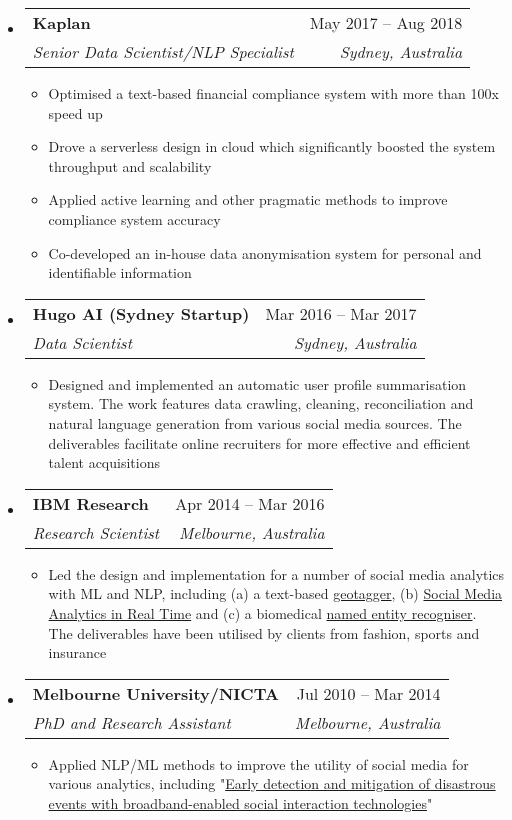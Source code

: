 \documentclass[letterpaper,12pt]{article}[leftmargin=*]
\makeatletter
\def \entryspacing {-0pt}
\newcommand{\resumeEntryStart}{\begin{itemize}[leftmargin=2.5mm]}
\newcommand{\resumeEntryEnd}{\end{itemize}\vspace{\entryspacing}}
\newcommand{\resumeItemListStart}{\begin{itemize}[leftmargin=4.5mm]}
\newcommand{\resumeItemListEnd}{\end{itemize}}
\newcommand{\resumeItem}[1]{
  \item\small{
    {#1 \vspace{-2pt}}
  }
}
\newcommand{\resumeEntryTSDL}[4]{
  \vspace{-1pt}\item[]
    \begin{tabularx}{0.97\textwidth}{X@{\hspace{60pt}}r}
      \textbf{\color{primary}#1} & {\firabook\color{accent}\small#2} \\
      \textit{\color{accent}\small#3} & \textit{\color{accent}\small#4} \\
    \end{tabularx}\vspace{-6pt}
}
\makeatother
\begin{document}
  \resumeEntryStart
    \resumeEntryTSDL
      {Kaplan}{May 2017 -- Aug 2018}
      {Senior Data Scientist/NLP Specialist}{Sydney, Australia}
    \resumeItemListStart
      \resumeItem {Optimised a text-based financial compliance system with more than 100x speed up} 
      \resumeItem{Drove a serverless design in cloud which significantly boosted the system throughput and scalability}
      \resumeItem {Applied active learning and other pragmatic methods to improve compliance system accuracy}
      \resumeItem {Co-developed an in-house data anonymisation system for personal and identifiable information}
    \resumeItemListEnd
  \resumeEntryEnd

  \resumeEntryStart
    \resumeEntryTSDL
      {Hugo AI (Sydney Startup)}{Mar 2016 -- Mar 2017}
      {Data Scientist}{Sydney, Australia}
    \resumeItemListStart
        \resumeItem {Designed and implemented an automatic user profile summarisation system. The work features data crawling, cleaning, reconciliation and natural language generation from various social media sources. The deliverables facilitate online recruiters for more effective and efficient talent acquisitions}
    \resumeItemListEnd
  \resumeEntryEnd

  \resumeEntryStart
    \resumeEntryTSDL
      {IBM Research}{Apr 2014 -- Mar 2016}
      {Research Scientist}{Melbourne, Australia}
    \resumeItemListStart
      \resumeItem {Led the design and implementation for a number of social media analytics with ML and NLP, including (a) a text-based \href{http://researcher.watson.ibm.com/researcher/view_group.php?id=6349}{geotagger}, (b) \href{http://researcher.watson.ibm.com/researcher/view_group.php?id=6350}{Social Media Analytics in Real Time} and (c) a biomedical \href{http://researcher.watson.ibm.com/researcher/view_group_pubs.php?grp=5727}{named entity recogniser}. The deliverables have been utilised by clients from fashion, sports and insurance}
    \resumeItemListEnd
  \resumeEntryEnd

  \resumeEntryStart
    \resumeEntryTSDL
      {Melbourne University/NICTA}{Jul 2010 -- Mar 2014}
      {PhD and Research Assistant}{Melbourne, Australia}
    \resumeItemListStart
      \resumeItem {Applied NLP/ML methods to improve the utility of social media for various analytics, including "\href{http://research.unimelb.edu.au/__data/assets/pdf_file/0006/1891914/IBES-2012-Annual-Report.pdf}{Early detection and mitigation of disastrous events with broadband-enabled social interaction technologies}"}
    \resumeItemListEnd
  \resumeEntryEnd
\end{document}
